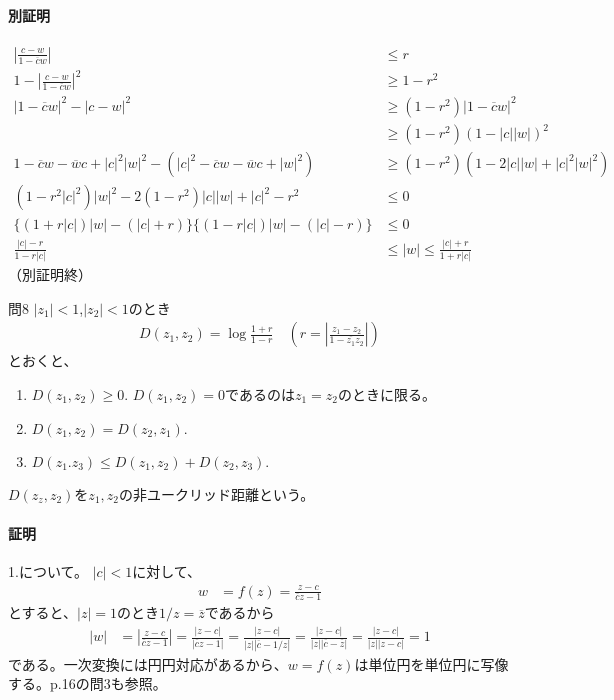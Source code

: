 \paragraph{別証明}
\begin{align*}
    \left|\frac{c-w}{1-\overline{c}w}\right|&\le r\\
    1-\left|\frac{c-w}{1-\overline{c}w}\right|^2&\ge 1-r^2\\
    |1-\overline{c}w|^2-|c-w|^2&\ge(1-r^2)|1-\overline{c}w|^2\\
    &\ge(1-r^2)(1-|c||w|)^2\\
    1-\overline{c}w-\overline{w}c+|c|^2|w|^2
    -(|c|^2-\overline{c}w-\overline{w}c+|w|^2)
    &\ge(1-r^2)(1-2|c||w|+|c|^2|w|^2)\\
    (1-r^2|c|^2)|w|^2-2(1-r^2)|c||w|+|c|^2-r^2&\le0\\
    \{(1+r|c|)|w|-(|c|+r)\}\{(1-r|c|)|w|-(|c|-r)\}&\le0\\
    \frac{|c|-r}{1-r|c|}&\le|w|\le\frac{|c|+r}{1+r|c|}
\end{align*}
（別証明終）

\newpage
\begin{mysimplebox}{問8}
    $|z_1|<1$,$|z_2|<1$のとき
    \begin{align*}
        D(z_1,z_2)=\log\frac{1+r}{1-r}\quad\left(r=\left|\frac{z_1-z_2}{1-\overline{z_1}z_2}\right|\right)
    \end{align*}
    とおくと、
    \begin{enumerate}
        \item $D(z_1,z_2)\ge0.$ $D(z_1,z_2)=0$であるのは$z_1=z_2$のときに限る。
        \item $D(z_1,z_2)=D(z_2,z_1).$
        \item $D(z_1.z_3)\le D(z_1,z_2)+D(z_2,z_3).$
    \end{enumerate}
    $D(z_z,z_2)$を$z_1,z_2$の非ユークリッド距離という。
\end{mysimplebox}
\paragraph{証明}
1.について。
$|c|<1$に対して、
\begin{align*}
    w&=f(z)=\frac{z-c}{\overline{c}z-1}
\end{align*}
とすると、$|z|=1$のとき$1/z=\overline{z}$であるから
\begin{align*}
    |w|&=\left|\frac{z-c}{\overline{c}z-1}\right|
    =\frac{|z-c|}{|\overline{c}z-1|}
    =\frac{|z-c|}{|z||\overline{c}-1/z|}
    =\frac{|z-c|}{|z||\overline{c}-\overline{z}|}
    =\frac{|z-c|}{|z||z-c|}=1
\end{align*}
である。一次変換には円円対応があるから、$w=f(z)$は単位円を単位円に写像する。p.16の問3も参照。

